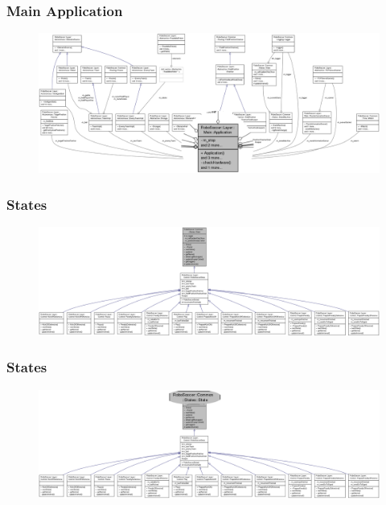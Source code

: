 \documentclass[hyperref={pdfpagelabels=false},compress]{beamer}
\begin{document}
\begin{frame}
	\frametitle{Main Application}
	\center
	\begin{figure}
		\centering
		\includegraphics[width = \textwidth]{collaboration_graph_application_zoomed.png}
	\end{figure}
\end{frame}

\begin{frame}
	\frametitle{States}
	\center
	\begin{figure}
		\centering
		\includegraphics[width = \textwidth]{inheritance_graph_states.png}
	\end{figure}
\end{frame}

\begin{frame}
	\frametitle{States}
	\center
	\begin{figure}
		\centering
		\includegraphics[width = \textwidth]{inheritance_graph_states_zoomed.png}
	\end{figure}
\end{frame}
\end{document}

